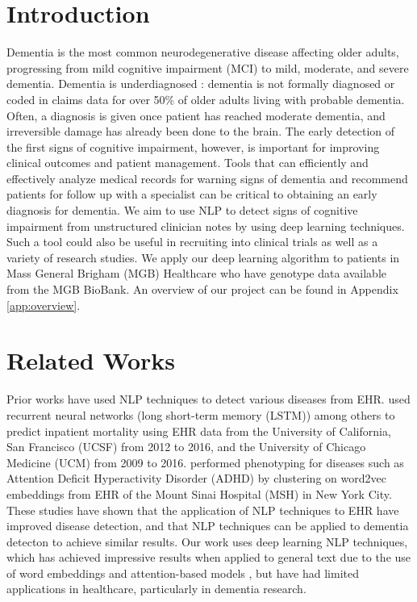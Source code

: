 \documentclass[pmlr,twocolumn,10pt]{jmlr} %
\begin{document}
\section{Introduction}
\label{sec:intro} Dementia is the most common neurodegenerative disease affecting older adults, progressing from mild cognitive impairment (MCI) to mild, moderate, and severe dementia. Dementia is underdiagnosed \citep{AlzheimerAssociation}: dementia is not formally diagnosed or coded in claims data for over 50\% of older adults living with probable dementia. Often, a diagnosis is given once patient has reached moderate dementia, and irreversible damage has already been done to the brain.  
The early detection of the first signs of cognitive impairment, however, is important for improving clinical outcomes and patient management. Tools that can efficiently and effectively analyze medical records for warning signs of dementia and recommend patients for follow up with a specialist can be critical to obtaining an early diagnosis for dementia. We aim to use NLP to detect signs of cognitive impairment from unstructured clinician notes by using deep learning techniques. Such a tool could also
be useful in recruiting into clinical trials as well as a
variety of research studies. We apply our deep learning algorithm to patients in Mass General Brigham (MGB) Healthcare who have genotype data available from the MGB BioBank. An overview of our project can be found in Appendix \ref{app:overview}. 

\section{Related Works}
\label{sec:RelatedWorks} 
Prior works have used NLP techniques to detect various diseases from EHR. \citep{rajkomar2018scalable} %
used recurrent neural networks (long short-term memory (LSTM)) among others to predict inpatient mortality using EHR data from the University of California, San Francisco (UCSF) from 2012 to 2016, and the University of Chicago Medicine (UCM) from 2009 to 2016.  \citep{glicksberg2018automated} %
performed phenotyping for diseases such as Attention Deficit Hyperactivity Disorder (ADHD) by clustering on word2vec embeddings from EHR of the Mount Sinai Hospital (MSH) in New York City. These studies have shown that the application of NLP techniques to EHR have improved disease detection, and that NLP techniques can be applied to dementia detecton to achieve similar results. Our work uses deep learning NLP techniques, which has achieved impressive results when applied to general text due to the use of word embeddings and attention-based models \citep{vaswani2017attention,mikolov2013distributed,pennington2014glove,peters2018deep, devlin2018bert}, but have had limited applications in healthcare, particularly in dementia research. 
\end{document}

